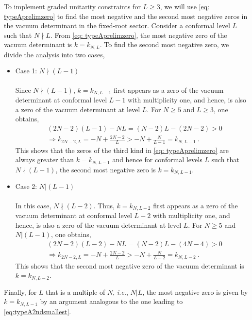 To implement graded unitarity constraints for $L \geqslant 3$, we will use \eqref{eq: typeAprelimzero} to find the most negative and the second most negative zeros in the vacuum determinant in the fixed-root sector. Consider a conformal level $L$ such that $N \nmid L$. From \eqref{eq: typeAprelimzero}, the most negative zero of the vacuum determinant is $k = k_{N,L}$. To find the second most negative zero, we divide the analysis into two cases,
\begin{itemize}
    \item Case 1: $N \nmid (L-1)$ \\ 
    \\
    Since $N \nmid (L-1)$, $k = k_{N,L-1}$ first appears as a zero of the vacuum determinant at conformal level $L-1$ with multiplicity one, and hence, is also a zero of the vacuum determinant at level $L$. For $N \geqslant 5$ and  $L \geqslant 3$, one obtains,
    \begin{equation} \label{eq:typeA2ndsmallest}
    \begin{split}
        &(2N-2)(L-1) - NL = (N-2)L - (2N-2) > 0 \\
        &\Longrightarrow k_{2N-2,L} = -N + \frac{2N-2}{L} > -N + \frac{N}{L-1} = k_{N,L-1}~.
    \end{split}
    \end{equation}
    This shows that the zeros of the third kind in \eqref{eq: typeAprelimzero} are always greater than $k = k_{N,L-1}$ and hence for conformal levels $L$ such that $N \nmid (L-1)$, the second most negative zero is $k = k_{N,L-1}$. 
    \item Case 2: $N | (L-1)$ \\ 
    \\
    In this case, $N \nmid (L-2)$. Thus, $k = k_{N,L-2}$ first appears as a zero of the vacuum determinant at conformal level $L-2$ with multiplicity one, and hence, is also a zero of the vacuum determinant at level $L$. For $N \geqslant 5$ and $N | (L-1)$, one obtains,
    \begin{equation}
    \begin{split}
        &(2N-2)(L-2) - NL = (N-2)L - (4N-4) > 0 \\
        &\Longrightarrow k_{2N-2,L} = -N + \frac{2N-2}{L} > -N + \frac{N}{L-2} = k_{N,L-2}~.
    \end{split}
    \end{equation}
    This shows that the second most negative zero of the vacuum determinant is $k = k_{N, L-2}$. 
\end{itemize}
Finally, for $L$ that is a multiple of $N$, \emph{i.e.}, $N | L$, the most negative zero is given by $k = k_{N, L-1}$ by an argument analogous to the one leading to \eqref{eq:typeA2ndsmallest}. 

